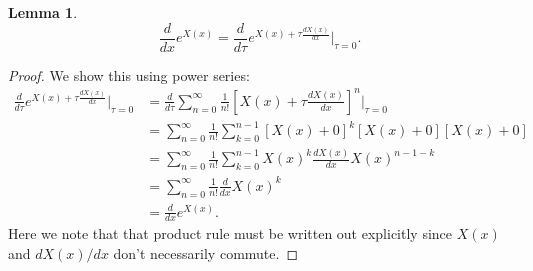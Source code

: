 \documentclass{article}
\theoremstyle{definition}
\newtheorem{lemma}{Lemma}
\newcommand{\f}[2]{\frac{#1}{#2}}
\newcommand{\lb}{\left[}
\newcommand{\rb}{\right]}
\begin{document}
\begin{enumerate}[label=(\alph*)]
	\begin{lemma}\label{lem:1}
	\begin{equation*}
	\f{d}{dx} e^{X(x)} = \f{d}{d\tau} e^{X(x) + \tau \f{dX(x)}{dx}} \bigg\vert_{\tau = 0}.
	\end{equation*}
	\end{lemma}
	\begin{proof}
		We show this using power series:
		\begin{align*}
		\f{d}{d\tau} e^{X(x) + \tau \f{dX(x)}{dx}} \bigg\vert_{\tau = 0} 
		&= \f{d}{d\tau}\sum^\infty_{n=0} \f{1}{n!} \lb X(x) + \tau \f{dX(x)}{dx} \rb^n \bigg\vert_{\tau=0}\\
		&= \sum^\infty_{n=0} \f{1}{n!} \sum^{n-1}_{k=0} \lb X(x) + 0   \rb^k \lb X(x) + 0  \rb \lb X(x) + 0  \rb\\
		&= \sum^\infty_{n=0} \f{1}{n!} \sum^{n-1}_{k=0}X(x)^k \f{dX(x)}{dx} X(x)^{n-1-k}\\
		&= \sum^\infty_{n=0} \f{1}{n!} \f{d}{dx} X(x)^k \\
		&= \f{d}{dx} e^{X(x)}.
		\end{align*}
		Here we note that that product rule must be written out explicitly since $X(x)$ and $dX(x)/dx$ don't necessarily commute. 
	\end{proof}


\end{enumerate}
\end{document}

